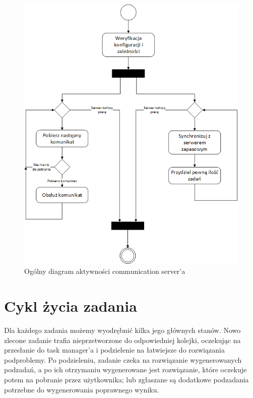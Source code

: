 \documentclass[12pt,a4paper,titlepage]{report}
\begin{document}
		\begin{figure}
			\centering
			\includegraphics[width=\textwidth]{img/CommunicationServer-General.png}
			\caption{Ogólny diagram aktywności communication server'a}
			\label{CommunicationServerGeneralActivity}
		\end{figure}
		
	\section{Cykl życia zadania}
	
		Dla każdego zadania możemy wyodrębnić kilka jego głównych stanów. Nowo zlecone zadanie
		trafia nieprzetworzone do odpowiedniej kolejki, oczekując na przesłanie do task manager'a
		i podzielenie na łatwiejsze do rozwiązania podproblemy. Po podzieleniu, zadanie czeka na rozwiązanie
		wygenerowanych podzadań, a po ich otrzymaniu wygenerowane jest rozwiązanie, które oczekuje potem na
		pobranie przez użytkownika; lub zgłaszane są dodatkowe podzadania potrzebne do wygenerowania poprawnego
		wyniku.
		
\end{document}
